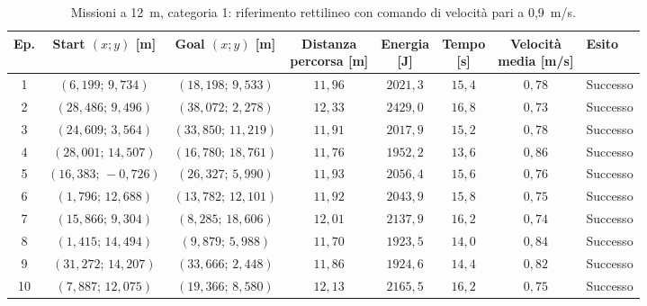 \begin{table}[H]
\centering
\caption{Missioni a 12~m, categoria 1: riferimento rettilineo con comando di velocità pari a 0,9~m/s.}
\label{tab:straight-line-0-9-12m-cat1}
\begingroup
\fontsize{9}{11}\selectfont
\setlength{\tabcolsep}{2.5pt}
\renewcommand{\arraystretch}{1.2}
\begin{tabular}{@{}c cc cccc l@{}}
\toprule
Ep. & \shortstack{Start $(x;y)$\\{}[m]} & \shortstack{Goal $(x;y)$\\{}[m]} & \shortstack{Distanza\\percorsa [m]} & \shortstack{Energia\\{}[J]} & \shortstack{Tempo\\{}[s]} & \shortstack{Velocità\\media [m/s]} & Esito \\
\midrule
1 & $(6{,}199;\,9{,}734)$ & $(18{,}198;\,9{,}533)$ & $11{,}96$ & $2021{,}3$ & $15{,}4$ & $0{,}78$ & Successo \\
2 & $(28{,}486;\,9{,}496)$ & $(38{,}072;\,2{,}278)$ & $12{,}33$ & $2429{,}0$ & $16{,}8$ & $0{,}73$ & Successo \\
3 & $(24{,}609;\,3{,}564)$ & $(33{,}850;\,11{,}219)$ & $11{,}91$ & $2017{,}9$ & $15{,}2$ & $0{,}78$ & Successo \\
4 & $(28{,}001;\,14{,}507)$ & $(16{,}780;\,18{,}761)$ & $11{,}76$ & $1952{,}2$ & $13{,}6$ & $0{,}86$ & Successo \\
5 & $(16{,}383;\,-0{,}726)$ & $(26{,}327;\,5{,}990)$ & $11{,}93$ & $2056{,}4$ & $15{,}6$ & $0{,}76$ & Successo \\
6 & $(1{,}796;\,12{,}688)$ & $(13{,}782;\,12{,}101)$ & $11{,}92$ & $2043{,}9$ & $15{,}8$ & $0{,}75$ & Successo \\
7 & $(15{,}866;\,9{,}304)$ & $(8{,}285;\,18{,}606)$ & $12{,}01$ & $2137{,}9$ & $16{,}2$ & $0{,}74$ & Successo \\
8 & $(1{,}415;\,14{,}494)$ & $(9{,}879;\,5{,}988)$ & $11{,}70$ & $1923{,}5$ & $14{,}0$ & $0{,}84$ & Successo \\
9 & $(31{,}272;\,14{,}207)$ & $(33{,}666;\,2{,}448)$ & $11{,}86$ & $1924{,}6$ & $14{,}4$ & $0{,}82$ & Successo \\
10 & $(7{,}887;\,12{,}075)$ & $(19{,}366;\,8{,}580)$ & $12{,}13$ & $2165{,}5$ & $16{,}2$ & $0{,}75$ & Successo \\
\bottomrule
\end{tabular}
\endgroup
\end{table}

